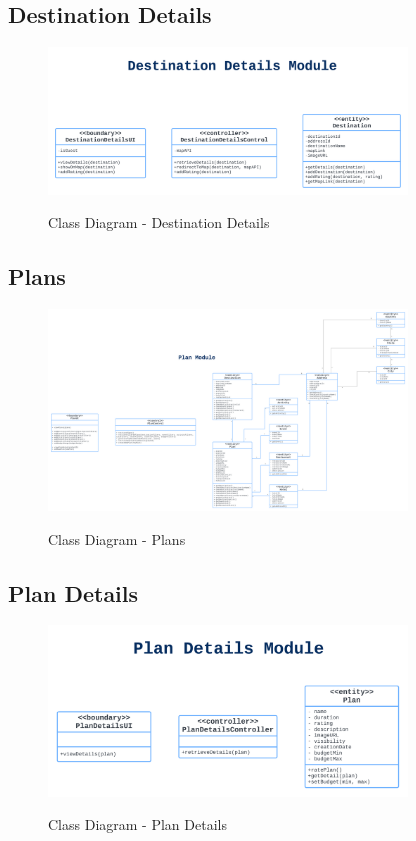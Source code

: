 \documentclass[12pt]{article}
\begin{document}
\subsection{Destination Details}
\begin{figure}[H]
    \centering
        \includegraphics[width=0.85\textwidth]{Class Diagram/Destination Details.png}
        \label{fig:ClassDestDetails}
    \caption{Class Diagram - Destination Details}
\end{figure}

\newpage
\subsection{Plans}
\begin{figure}[H]
    \centering
        \includegraphics[width=0.85\textwidth]{Class Diagram/Plans.png}
        \label{fig:ClassPlans}
    \caption{Class Diagram - Plans}
\end{figure}

\subsection{Plan Details}
\begin{figure}[H]
    \centering
        \includegraphics[width=0.85\textwidth]{Class Diagram/Plan Details.png}
        \label{fig:ClassPlanDetails}
    \caption{Class Diagram - Plan Details}
\end{figure}
\end{document}
